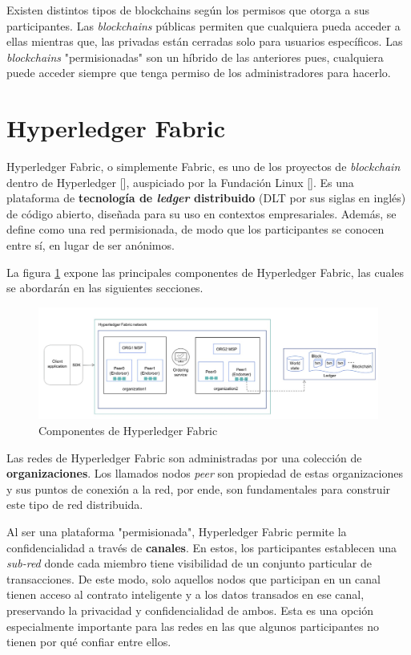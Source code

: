 Existen distintos tipos de blockchains según los permisos que otorga a sus participantes. Las \textit{blockchains} públicas permiten que cualquiera pueda acceder a ellas mientras que, las privadas están cerradas solo para usuarios específicos. Las \textit{blockchains} "permisionadas" son un híbrido de las anteriores pues, cualquiera puede acceder siempre que tenga permiso de los administradores para hacerlo.
\section{Hyperledger Fabric}

Hyperledger Fabric, o simplemente Fabric, es uno de los proyectos de \textit{blockchain} dentro de Hyperledger [\cite{hyperledger-foundation}], auspiciado por la Fundación Linux [\cite{linux-foundation}]. Es una plataforma de \textbf{tecnología de \textit{ledger} distribuido} (DLT por sus siglas en inglés) de código abierto, diseñada para su uso en contextos empresariales. Además, se define como una red permisionada, de modo que los participantes se conocen entre sí, en lugar de ser anónimos. 

La figura \ref{fig:hlfcomponents} expone las principales componentes de Hyperledger Fabric, las cuales se abordarán en las siguientes secciones. 

\begin{figure}[tbph]
\centering
\hspace*{-1.0in}
\includegraphics[width=20cm]{Images/hlf1}
\caption{Componentes de Hyperledger Fabric}
\label{fig:hlfcomponents}
\end{figure}


Las redes de Hyperledger Fabric son administradas por una colección de \textbf{organizaciones}. Los llamados nodos \textit{peer} son propiedad de estas organizaciones y sus puntos de conexión a la red, por ende, son fundamentales para construir este tipo de red distribuida. 

Al ser una plataforma "permisionada", Hyperledger Fabric permite la confidencialidad a través de \textbf{canales}. En estos, los participantes establecen una \textit{sub-red} donde cada miembro tiene visibilidad de un conjunto particular de transacciones. De este modo, solo aquellos nodos que participan en un canal tienen acceso al contrato inteligente y a los datos transados en ese canal, preservando la privacidad y confidencialidad de ambos.
Esta es una opción especialmente importante para las redes en las que algunos participantes no tienen por qué confiar entre ellos. 

